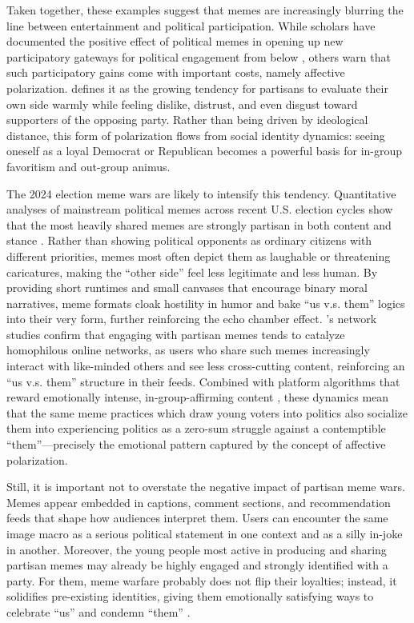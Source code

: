 \documentclass[12pt,twoside]{article}
\begin{document}
Taken together, these examples suggest that memes are increasingly blurring the line between entertainment and political participation. While scholars have documented the positive effect of political memes in opening up new participatory gateways for political engagement from below \parencite{sreekumar2013onlinepoliticalmemes, ahmed2024breakingbarriersmemes, mushtaq2025betweenhumorharm}, others warn that such participatory gains come with important costs, namely affective polarization. \textcites[130]{iyengar2019originsaffectivepolarization} defines it as the growing tendency for partisans to evaluate their own side warmly while feeling dislike, distrust, and even disgust toward supporters of the opposing party. Rather than being driven by ideological distance, this form of polarization flows from social identity dynamics: seeing oneself as a loyal Democrat or Republican becomes a powerful basis for in-group favoritism and out-group animus.  

The 2024 election meme wars are likely to intensify this tendency. Quantitative analyses of mainstream political memes across recent U.S. election cycles show that the most heavily shared memes are strongly partisan in both content and stance \parencite{collier2024compositionmainstreammemes}. Rather than showing political opponents as ordinary citizens with different priorities, memes most often depict them as laughable or threatening caricatures, making the ``other side'' feel less legitimate and less human. By providing short runtimes and small canvases that encourage binary moral narratives, meme formats cloak hostility in humor and bake ``us v.s. them'' logics into their very form, further reinforcing the echo chamber effect. \textcite{kim2023partisanmemes}'s network studies confirm that engaging with partisan memes tends to catalyze homophilous online networks, as users who share such memes increasingly interact with like-minded others and see less cross-cutting content, reinforcing an ``us v.s. them'' structure in their feeds. Combined with platform algorithms that reward emotionally intense, in-group-affirming content \parencite{ye2025auditingexposurebias}, these dynamics mean that the same meme practices which draw young voters into politics also socialize them into experiencing politics as a zero-sum struggle against a contemptible ``them''---precisely the emotional pattern captured by the concept of affective polarization.


Still, it is important not to overstate the negative impact of partisan meme wars. Memes appear embedded in captions, comment sections, and recommendation feeds that shape how audiences interpret them. Users can encounter the same image macro as a serious political statement in one context and as a silly in-joke in another. Moreover, the young people most active in producing and sharing partisan memes may already be highly engaged and strongly identified with a party. For them, meme warfare probably does not flip their loyalties; instead, it solidifies pre-existing identities, giving them emotionally satisfying ways to celebrate ``us'' and condemn ``them'' \parencite{galipeau2023impactpoliticalmemes}.
\end{document}
